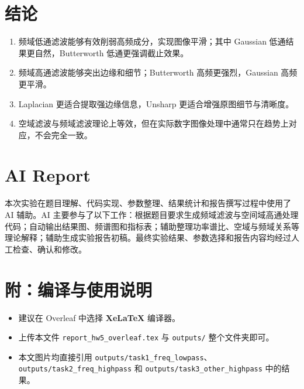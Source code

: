 \documentclass[UTF8,a4paper,12pt]{ctexart}
\begin{document}
\section{结论}
\begin{enumerate}
  \item 频域低通滤波能够有效削弱高频成分，实现图像平滑；其中 Gaussian 低通结果更自然，Butterworth 低通更强调截止效果。
  \item 频域高通滤波能够突出边缘和细节；Butterworth 高频更强烈，Gaussian 高频更平滑。
  \item Laplacian 更适合提取强边缘信息，Unsharp 更适合增强原图细节与清晰度。
  \item 空域滤波与频域滤波理论上等效，但在实际数字图像处理中通常只在趋势上对应，不会完全一致。
\end{enumerate}

\section*{AI Report}
本次实验在题目理解、代码实现、参数整理、结果统计和报告撰写过程中使用了 AI 辅助。AI 主要参与了以下工作：根据题目要求生成频域滤波与空间域高通处理代码；自动输出结果图、频谱图和指标表；辅助整理功率谱比、空域与频域关系等理论解释；辅助生成实验报告初稿。最终实验结果、参数选择和报告内容均经过人工检查、确认和修改。

\section*{附：编译与使用说明}
\begin{itemize}
  \item 建议在 Overleaf 中选择 \textbf{XeLaTeX} 编译器。
  \item 上传本文件 \texttt{report\_hw5\_overleaf.tex} 与 \texttt{outputs/} 整个文件夹即可。
  \item 本文图片均直接引用 \texttt{outputs/task1\_freq\_lowpass}、\texttt{outputs/task2\_freq\_highpass} 和 \texttt{outputs/task3\_other\_highpass} 中的结果。
\end{itemize}
\end{document}
